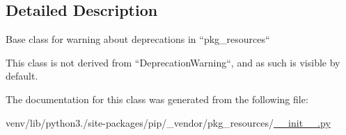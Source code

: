 \subsection{Detailed Description}
\begin{DoxyVerb}Base class for warning about deprecations in ``pkg_resources``

This class is not derived from ``DeprecationWarning``, and as such is
visible by default.
\end{DoxyVerb}
 

The documentation for this class was generated from the following file\+:\begin{DoxyCompactItemize}
\item 
venv/lib/python3./site-\/packages/pip/\+\_\+vendor/pkg\+\_\+resources/\hyperlink{venv_2lib_2python3_89_2site-packages_2pip_2__vendor_2pkg__resources_2____init_____8py}{\+\_\+\+\_\+init\+\_\+\+\_\+.\+py}\end{DoxyCompactItemize}

